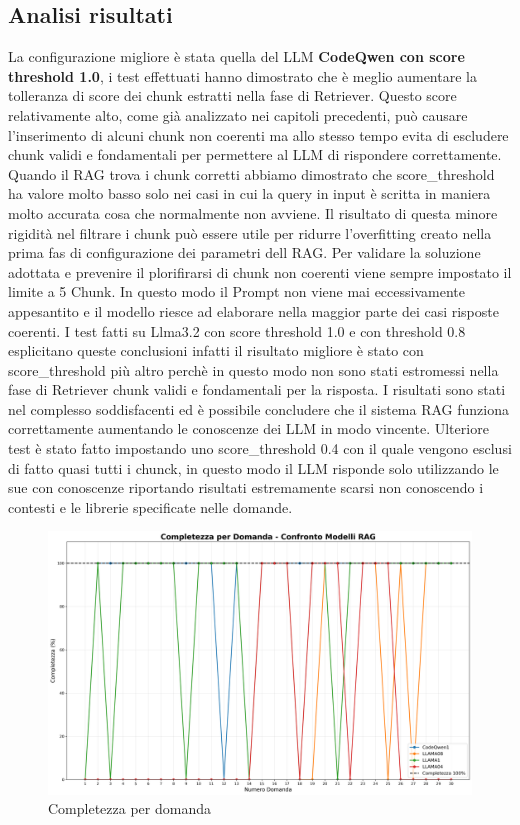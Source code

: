 \documentclass[12pt,a4paper,openright,twoside]{book}
\begin{document}
\subsection{Analisi risultati}
La configurazione migliore è stata quella del LLM \textbf{CodeQwen con score threshold 1.0},
i test effettuati hanno dimostrato che è meglio aumentare la tolleranza di score dei chunk estratti nella fase di Retriever.
Questo score relativamente alto, come già analizzato nei capitoli precedenti, può causare l'inserimento di alcuni chunk non coerenti ma allo stesso tempo evita di escludere chunk validi e fondamentali per permettere al LLM di rispondere correttamente.
Quando il RAG trova i chunk corretti abbiamo dimostrato che score\_threshold ha valore molto basso solo nei casi in cui la query in input è scritta in maniera molto accurata cosa che 
normalmente non avviene.
Il risultato di questa minore rigidità nel filtrare i chunk può essere utile per ridurre l'overfitting creato nella prima fas di configurazione dei parametri dell RAG.
Per validare la soluzione adottata e prevenire il plorifirarsi di chunk non coerenti viene sempre impostato il limite a 5 Chunk.
In questo modo il Prompt non viene mai eccessivamente appesantito e il modello riesce ad elaborare nella maggior parte dei casi risposte coerenti.
I test fatti su Llma3.2 con score threshold 1.0 e con threshold 0.8 esplicitano queste conclusioni infatti il risultato migliore è stato con score\_threshold più altro perchè in questo modo 
non sono stati estromessi nella fase di Retriever chunk validi e fondamentali per la risposta.
I risultati sono stati nel complesso soddisfacenti ed è possibile concludere che il sistema RAG funziona correttamente aumentando le conoscenze dei LLM in modo vincente.
Ulteriore test è stato fatto impostando uno score\_threshold 0.4 con il quale vengono esclusi di fatto quasi tutti i chunck, in questo modo il LLM risponde solo utilizzando le sue con conoscenze riportando risultati estremamente scarsi non conoscendo i contesti e le librerie specificate nelle domande.
\begin{figure}[h]
    \centering
    \includegraphics[width=\textwidth]{figures/completezza_per_domanda.png}
    \caption{Completezza per domanda}
    \label{fig:completezza-per-domanda}
\end{figure}
\end{document}
